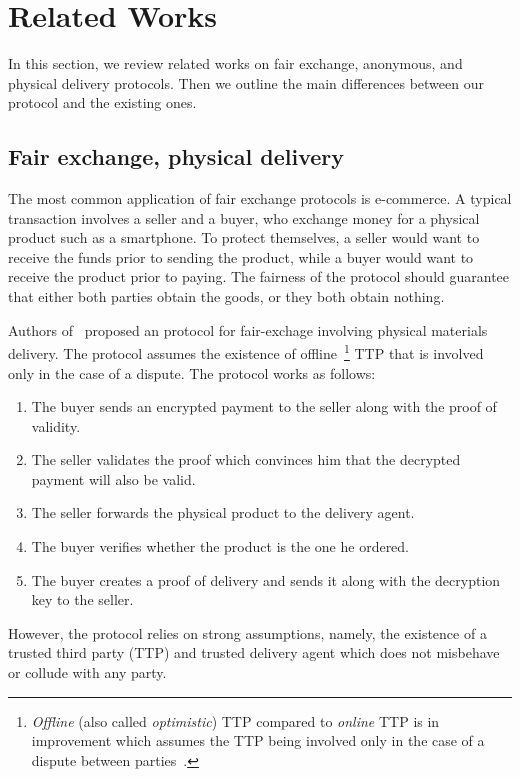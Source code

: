\section{Related Works}\label{sec:related-works}
In this section, we review related works on fair exchange, anonymous, and physical delivery protocols. Then we outline the main differences between our protocol and the existing ones.

\subsection{Fair exchange, physical delivery}
The most common application of fair exchange protocols is e-commerce. A typical transaction involves a seller and a buyer, who exchange money for a physical product such as a smartphone. To protect themselves, a seller would want to receive the funds prior to sending the product, while a buyer would want to receive the product prior to paying. The fairness of the protocol should guarantee that either both parties obtain the goods, or they both obtain nothing.

Authors of~\cite{mohammedalarajFairnessPhysicalProducts2012} proposed an protocol for fair-exchage involving physical materials delivery. The protocol assumes the existence of offline~\footnote{\textit{Offline} (also called \textit{optimistic}) TTP compared to \textit{online} TTP is in improvement which assumes the TTP being involved only in the case of a dispute between parties~\cite{rayFairExchangeEcommerce2002}.} TTP that is involved only in the case of a dispute. The protocol works as follows: 
\begin{enumerate}
\item The buyer sends an encrypted payment to the seller along with the proof of validity.
\item The seller validates the proof which convinces him that the decrypted payment will also be valid.
\item The seller forwards the physical product to the delivery agent.
\item The buyer verifies whether the product is the one he ordered.
\item The buyer creates a proof of delivery and sends it along with the decryption key to the seller.
\end{enumerate}

However, the protocol relies on strong assumptions, namely, the existence of a trusted third party (TTP) and trusted delivery agent which does not misbehave or collude with any party.

